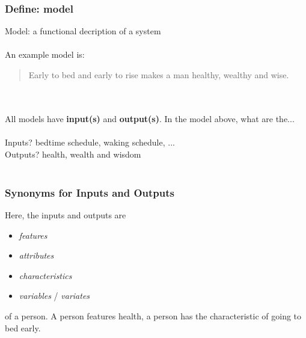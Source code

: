 \documentclass[slides]{beamer} %
\begin{document}
\begin{frame}\frametitle{Define: model}

Model: a functional decription of a system  \pause \\~\\ An example model is:

\begin{quotation}
Early to bed and early to rise makes a man healthy, wealthy and wise.
\end{quotation}

 \\~\\

All models have \textbf{input(s)} and \textbf{output(s)}. In the model above, what are the... \\~\\

Inputs? \pause bedtime schedule, waking schedule, ... \\
Outputs? \pause health, wealth and wisdom \\~\\

\end{frame}


\begin{frame}\frametitle{Synonyms for Inputs and Outputs}

\small
Here, the inputs and outputs are 

\begin{itemize}
\item \textit{features} 
\item \textit{attributes} 
\item \textit{characteristics}
\item \textit{variables} / \textit{variates}
\end{itemize}

of a person. A person features health, a person has the characteristic of going to bed early. \\~\\


\end{frame}
\end{document}

